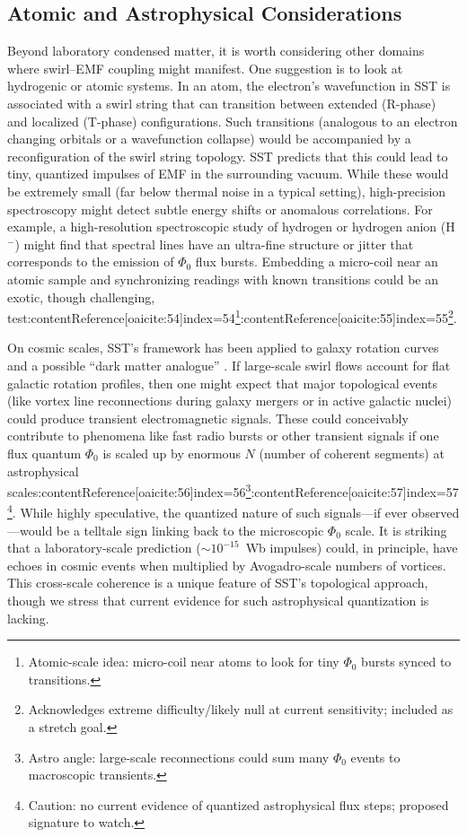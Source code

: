 \documentclass[12pt]{article}
\begin{document}
    \subsection{Atomic and Astrophysical Considerations}
        Beyond laboratory condensed matter, it is worth considering other domains where swirl–EMF coupling might manifest. One suggestion \cite{Iskandarani2025FluxComp} is to look at hydrogenic or atomic systems. In an atom, the electron’s wavefunction in SST is associated with a swirl string that can transition between extended (R-phase) and localized (T-phase) configurations. Such transitions (analogous to an electron changing orbitals or a wavefunction collapse) would be accompanied by a reconfiguration of the swirl string topology. SST predicts that this could lead to tiny, quantized impulses of EMF in the surrounding vacuum. While these would be extremely small (far below thermal noise in a typical setting), high-precision spectroscopy might detect subtle energy shifts or anomalous correlations. For example, a high-resolution spectroscopic study of hydrogen or hydrogen anion (H$^{-}$) might find that spectral lines have an ultra-fine structure or jitter that corresponds to the emission of $\Phi_{0}$ flux bursts. Embedding a micro-coil near an atomic sample and synchronizing readings with known transitions could be an exotic, though challenging, test:contentReference[oaicite:54]{index=54}\footnote{Atomic-scale idea: micro-coil near atoms to look for tiny $\Phi_0$ bursts synced to transitions.}:contentReference[oaicite:55]{index=55}\footnote{Acknowledges extreme difficulty/likely null at current sensitivity; included as a stretch goal.}.

        On cosmic scales, SST’s framework has been applied to galaxy rotation curves and a possible ``dark matter analogue'' \cite{Iskandarani2025RotatingFrame}. If large-scale swirl flows account for flat galactic rotation profiles, then one might expect that major topological events (like vortex line reconnections during galaxy mergers or in active galactic nuclei) could produce transient electromagnetic signals. These could conceivably contribute to phenomena like fast radio bursts or other transient signals if one flux quantum $\Phi_{0}$ is scaled up by enormous $N$ (number of coherent segments) at astrophysical scales:contentReference[oaicite:56]{index=56}\footnote{Astro angle: large-scale reconnections could sum many $\Phi_0$ events to macroscopic transients.}:contentReference[oaicite:57]{index=57}\footnote{Caution: no current evidence of quantized astrophysical flux steps; proposed signature to watch.}. While highly speculative, the quantized nature of such signals—if ever observed—would be a telltale sign linking back to the microscopic $\Phi_{0}$ scale. It is striking that a laboratory-scale prediction ($\sim10^{-15}$~Wb impulses) could, in principle, have echoes in cosmic events when multiplied by Avogadro-scale numbers of vortices. This cross-scale coherence is a unique feature of SST’s topological approach, though we stress that current evidence for such astrophysical quantization is lacking.
\end{document}
